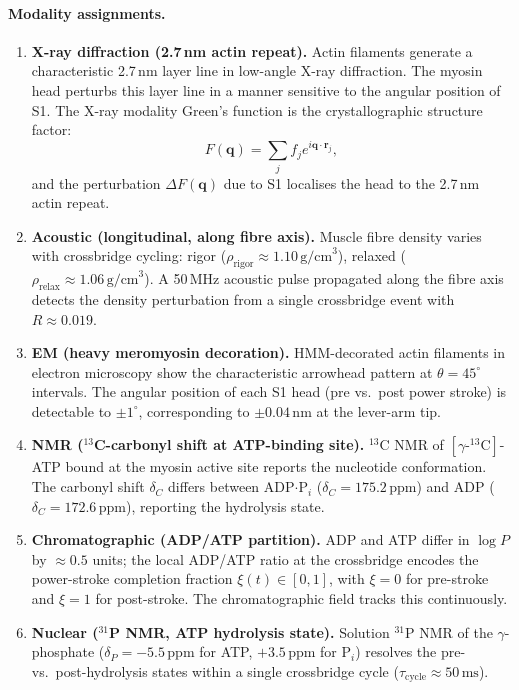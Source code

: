 \paragraph{Modality assignments.}
\begin{enumerate}[label=(\arabic*),leftmargin=2em]
\item \textbf{X-ray diffraction (2.7\,nm actin repeat).}
  Actin filaments generate a characteristic 2.7\,nm layer line in
  low-angle X-ray diffraction.  The myosin head perturbs this layer line
  in a manner sensitive to the angular position of S1.  The X-ray modality
  Green's function is the crystallographic structure factor:
  \[
    F(\mathbf{q}) = \sum_j f_j e^{i\mathbf{q}\cdot\mathbf{r}_j},
  \]
  and the perturbation $\Delta F(\mathbf{q})$ due to S1 localises the head
  to the 2.7\,nm actin repeat.

\item \textbf{Acoustic (longitudinal, along fibre axis).}
  Muscle fibre density varies with crossbridge cycling: rigor ($\rho_\text{rigor}
  \approx 1.10\,\text{g/cm}^3$), relaxed ($\rho_\text{relax} \approx
  1.06\,\text{g/cm}^3$).  A 50\,MHz acoustic pulse propagated along the fibre
  axis detects the density perturbation from a single crossbridge event with
  $R \approx 0.019$.

\item \textbf{EM (heavy meromyosin decoration).}
  HMM-decorated actin filaments in electron microscopy show the characteristic
  arrowhead pattern at $\theta = 45^\circ$ intervals.  The angular position of
  each S1 head (pre vs.\ post power stroke) is detectable to $\pm 1^\circ$,
  corresponding to $\pm 0.04\,\text{nm}$ at the lever-arm tip.

\item \textbf{NMR ($^{13}$C-carbonyl shift at ATP-binding site).}
  $^{13}$C NMR of $[\gamma\text{-}^{13}\text{C}]$-ATP bound at the myosin
  active site reports the nucleotide conformation.  The carbonyl shift
  $\delta_C$ differs between ADP$\cdot$P$_i$ ($\delta_C = 175.2\,\text{ppm}$)
  and ADP ($\delta_C = 172.6\,\text{ppm}$), reporting the hydrolysis state.

\item \textbf{Chromatographic (ADP/ATP partition).}
  ADP and ATP differ in $\log P$ by $\approx 0.5$ units; the local
  ADP/ATP ratio at the crossbridge encodes the power-stroke completion
  fraction $\xi(t) \in [0,1]$, with $\xi = 0$ for pre-stroke and $\xi = 1$
  for post-stroke.  The chromatographic field tracks this continuously.

\item \textbf{Nuclear ($^{31}$P NMR, ATP hydrolysis state).}
  Solution $^{31}$P NMR of the $\gamma$-phosphate ($\delta_P = -5.5\,\text{ppm}$
  for ATP, $+3.5\,\text{ppm}$ for P$_i$) resolves the pre- vs.\ post-hydrolysis
  states within a single crossbridge cycle ($\tau_\text{cycle} \approx 50\,\text{ms}$).
\end{enumerate}

